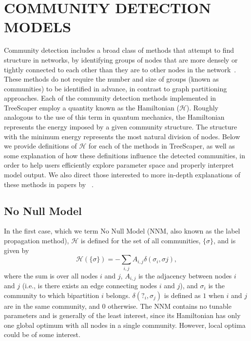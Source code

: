 \documentclass[11pt]{article}
\begin{document}
\newpage
\appendix
\section{COMMUNITY DETECTION MODELS}\label{appendix:CDModels}

Community detection includes a broad class of methods that attempt to find structure in
networks, by identifying groups of nodes that are more densely or tightly connected to each
other than they are to other nodes in the network~\citep{Newman:2010}. These methods do not
require the number and size of groups (known as communities) to be identified in advance,
in contrast to graph partitioning approaches. Each of the community detection methods
implemented in TreeScaper employ a quantity known as the Hamiltonian ($\mathcal{H}$). Roughly
analogous to the use of this term in quantum mechanics, the Hamiltonian represents the
energy imposed by a given community structure. The structure with the minimum energy
represents the most natural division of nodes. Below we provide definitions of $\mathcal{H}$ for each of the methods in TreeScaper, as well as some explanation of how these definitions influence the
detected communities, in order to help users efficiently explore parameter space and properly
interpret model output. We also direct those interested to more in-depth explanations of
these methods in papers by ~\citealp{Fortunato:2010,RB:2006,RAK:2007,TVDN:2011}. \\

\subsection{No Null Model}\label{appendix:NoNullModel}
In the first case, which we term No Null Model (NNM, also known as the label propagation
method), $\mathcal{H}$ is defined for the set of all communities, $\{\sigma\}$, and is given by
\begin{equation}\label{eq:NoNullModel}
\mathcal{H}(\{\sigma\}) = - \displaystyle\sum_{i,j} A_{i,j} \delta(\sigma_{i}, \sigma{j}),
\end{equation}
where the sum is over all nodes $i$ and $j$, $A_{i,j}$ is the adjacency between nodes $i$ and $j$ (i.e., is there exists an edge connecting nodes $i$ and $j$), and $\sigma_{i}$ is the community to which bipartition $i$ belongs. $\delta(?_{i}, \sigma_{j})$ is defined as $1$ when $i$ and $j$ are in the same community, and $0$ otherwise. The NNM contains no tunable parameters and is generally of the least interest, since its Hamiltonian has only one global optimum with all nodes in a single community. However, local optima could be of some interest. \\
\end{document}
